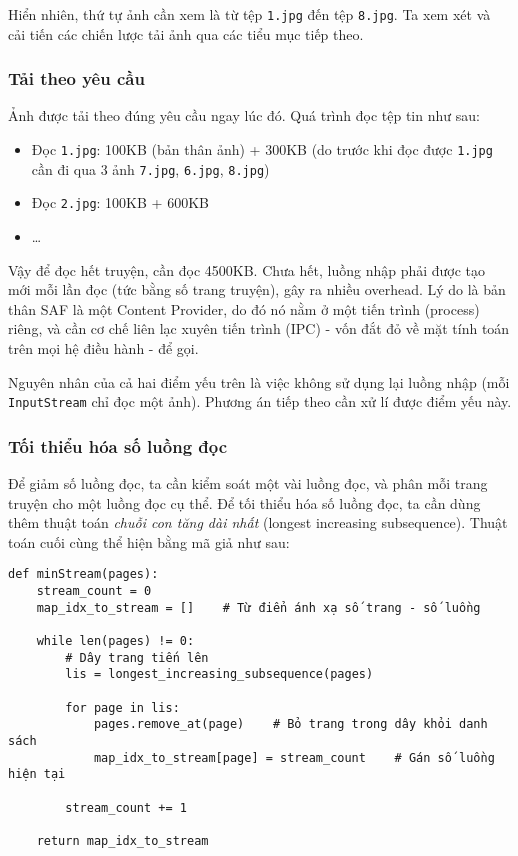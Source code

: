 \documentclass[../../../../thesis]{subfiles}
\begin{document}
Hiển nhiên, thứ tự ảnh cần xem là từ tệp \texttt{1.jpg} đến tệp
\texttt{8.jpg}. Ta xem xét và cải tiến các chiến lược tải ảnh qua các
tiểu mục tiếp theo.

\subsubsection{Tải theo yêu cầu}

Ảnh được tải theo đúng yêu cầu ngay lúc đó. Quá trình đọc tệp tin như sau:

\begin{itemize}
    \item
        Đọc \texttt{1.jpg}: 100KB (bản thân ảnh) + 300KB (do trước khi đọc được
        \texttt{1.jpg} cần đi qua 3 ảnh \texttt{7.jpg}, \texttt{6.jpg},
        \texttt{8.jpg})
    \item
        Đọc \texttt{2.jpg}: 100KB + 600KB
    \item
        \ldots{}
\end{itemize}

Vậy để đọc hết truyện, cần đọc 4500KB. Chưa hết, luồng nhập phải được tạo mới mỗi
lần đọc (tức bằng số trang truyện), gây ra nhiều overhead. Lý do là bản thân SAF
là một Content Provider, do đó nó nằm ở một tiến trình (process) riêng, và cần
cơ chế liên lạc xuyên tiến trình (IPC) - vốn đắt đỏ về mặt tính toán trên mọi hệ
điều hành - để gọi.

Nguyên nhân của cả hai điểm yếu trên là việc không sử dụng lại luồng nhập (mỗi
\texttt{InputStream} chỉ đọc một ảnh). Phương án tiếp theo cần xử lí được điểm
yếu này.

\subsubsection{Tối thiểu hóa số luồng đọc}

Để giảm số luồng đọc, ta cần kiểm soát một vài luồng đọc, và phân mỗi trang
truyện cho một luồng đọc cụ thể. Để tối thiểu hóa số luồng đọc, ta cần dùng thêm
thuật toán \emph{chuỗi con tăng dài nhất} (longest increasing subsequence).
Thuật toán cuối cùng thể hiện bằng mã giả như sau:

\begin{verbatim}
def minStream(pages):
    stream_count = 0
    map_idx_to_stream = []    # Từ điển ánh xạ số trang - số luồng

    while len(pages) != 0:
        # Dây trang tiến lên
        lis = longest_increasing_subsequence(pages)

        for page in lis:
            pages.remove_at(page)    # Bỏ trang trong dây khỏi danh sách
            map_idx_to_stream[page] = stream_count    # Gán số luồng hiện tại

        stream_count += 1

    return map_idx_to_stream
\end{verbatim}
\end{document}
